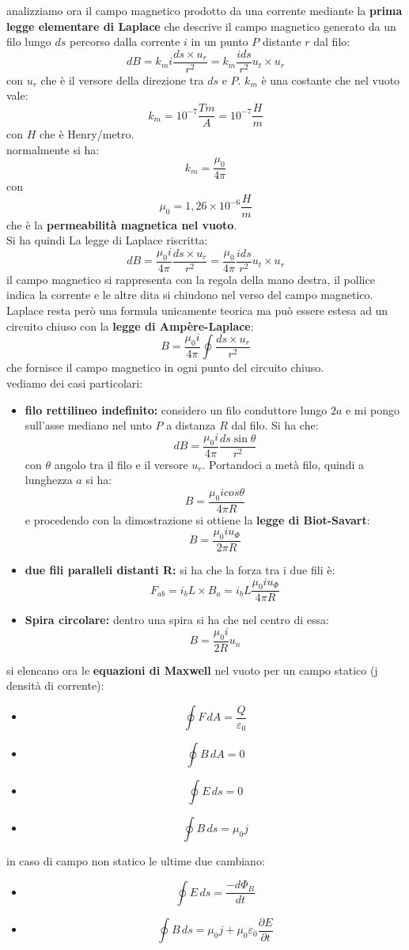 \documentclass[a4paper,12pt, oneside]{book}
\begin{document}
analizziamo ora il campo magnetico prodotto da una corrente mediante la \textbf{prima legge elementare di Laplace} che descrive il campo magnetico generato da un filo lungo $ds$ percorso dalla corrente $i$ in un punto $P$ distante $r$ dal filo:
$$dB=k_mi\frac{ds\times u_r}{r^2}=k_m\frac{ids}{r^2}u_t\times u_r$$
con $u_r$ che è il versore della direzione tra $ds$ e $P$. $k_m$ è una costante che nel vuoto vale:
$$k_m=10^{-7}\frac{Tm}{A}=10^{-7}\frac{H}{m}$$
con $H$ che è Henry/metro.\\
normalmente si ha:
$$k_m=\frac{\mu_0}{4\pi}$$
con
$$\mu_0=1,26\times 10^{-6}\frac{H}{m}$$
che è la \textbf{permeabilità magnetica nel vuoto}.\\
Si ha quindi La legge di Laplace riscritta:
$$dB=\frac{\mu_0i}{4\pi}\frac{ds\times u_r}{r^2}=\frac{\mu_0}{4\pi}\frac{ids}{r^2}u_t\times u_r$$
il campo magnetico si rappresenta con la regola della mano destra, il pollice indica la corrente e le altre dita si chiudono nel verso del campo magnetico.\\ Laplace resta però una formula unicamente teorica ma può essere estesa ad un circuito chiuso con la \textbf{legge di Ampère-Laplace}:
$$B=\frac{\mu_0i}{4\pi}\oint\frac{ds\times u_r}{r^2}$$
che fornisce il campo magnetico in ogni punto del circuito chiuso.\\
vediamo dei casi particolari:
\begin{itemize}
	\item \textbf{filo rettilineo indefinito:} considero un filo conduttore lungo $2a$ e mi pongo sull'asse mediano nel unto $P$ a distanza $R$ dal filo. Si ha che:
	      $$dB=\frac{\mu_0i}{4\pi}\frac{ds\sin\theta}{r^2}$$
	      con $\theta$ angolo tra il filo e il versore $u_r$. Portandoci a metà filo, quindi a lunghezza $a$ si ha:
	      $$B=\frac{\mu_0icos\theta}{4\pi R}$$
	      e procedendo con la dimostrazione si ottiene la \textbf{legge di Biot-Savart}:
	      $$B=\frac{\mu_0 iu_\Phi}{2\pi R}$$
	\item \textbf{due fili paralleli distanti R:} si ha che la forza tra i due fili è:
	      $$F_{ab}=i_bL\times B_a=i_bL\frac{\mu_0iu_\Phi}{4\pi R}$$
	\item \textbf{Spira circolare:} dentro una spira si ha che nel centro di essa:
	      $$B=\frac{\mu_0i}{2 R}u_n$$
\end{itemize}
si elencano ora le \textbf{equazioni di Maxwell} nel vuoto per un campo statico (j densità di corrente):
\begin{itemize}
	\item $$\oint F\,dA=\frac{Q}{\varepsilon_0}$$
	\item  $$\oint B\,dA=0$$
	\item  $$\oint E\,ds=0$$
	\item  $$\oint B\,ds=\mu_0 j$$
\end{itemize}
in caso di campo non statico le ultime due cambiano:
\begin{itemize}
	\item  $$\oint E\,ds=\frac{-d\Phi_B}{dt}$$
	\item  $$\oint B\,ds=\mu_0 j+\mu_0\varepsilon_0\frac{\partial E}{\partial t}$$
\end{itemize}
\end{document}
